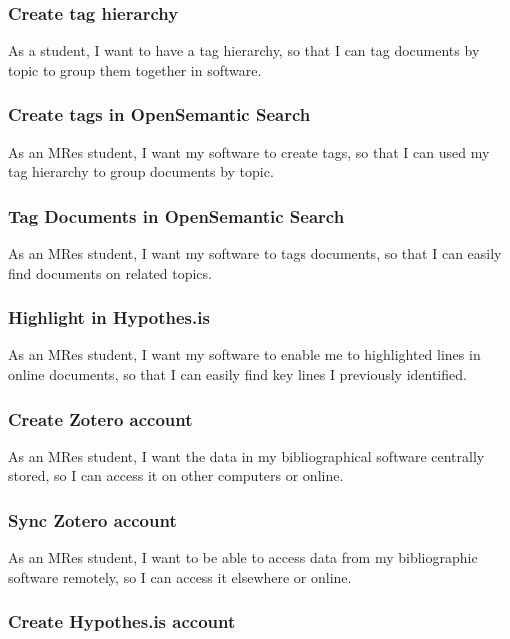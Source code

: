 \documentclass{article}
\begin{document}
\subsubsection*{Create tag hierarchy}

As a student, I want to have a tag hierarchy, so that I can tag documents by topic to group them together in software.

\subsubsection*{Create tags in OpenSemantic Search}

As an MRes student, I want my software to create tags, so that I can used my tag hierarchy to group documents by topic.

\subsubsection*{Tag Documents in OpenSemantic Search}

As an MRes student, I want my software to tags documents, so that I can easily find documents on related topics.

\subsubsection*{Highlight in Hypothes.is}

As an MRes student, I want my software to enable me to highlighted lines in online documents, so that I can easily find key lines I previously identified.

\subsubsection*{Create Zotero account}

As an MRes student, I want the data in my bibliographical software centrally stored, so I can access it on other computers or online.

\subsubsection*{Sync Zotero account}

As an MRes student, I want to be able to access data from my bibliographic software remotely, so I can access it elsewhere or online.

\subsubsection*{Create Hypothes.is account}
\end{document}
